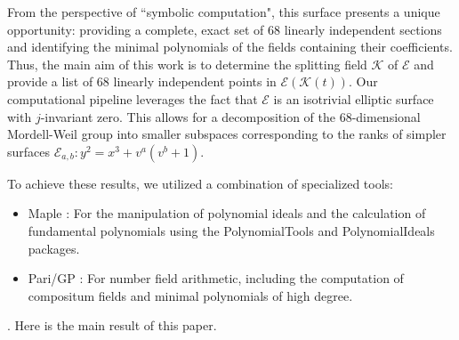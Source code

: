\documentclass[11pt]{amsart}
\newcommand{\Ee}{{\mathcal E}}
\newcommand{\KK}{{\mathcal K}}
\numberwithin{equation}{section}
\numberwithin{table}{section}
\newcommand\<{\langle}
\begin{document}
From the perspective of ``symbolic computation", this surface presents a unique opportunity: providing a complete, exact set of $68$ linearly independent sections and identifying the minimal polynomials of the fields containing their coefficients.
Thus, the main aim of this work is to  determine the splitting field $\KK$ of $\Ee$ and  provide a list of $68$ linearly independent points in $\Ee(\KK(t))$. 	Our computational pipeline leverages the fact that $\mathcal{E}$ is an isotrivial elliptic surface with $j$-invariant zero. This allows for a decomposition of the $68$-dimensional Mordell-Weil group into smaller subspaces corresponding to the ranks of simpler   surfaces
 $\mathcal{E}_{a,b} : y^2 = x^3 + v^a(v^b+1)$.  

	To achieve these results, we utilized a combination of specialized tools:
\begin{itemize}
	\item \textsf{Maple  \cite{maple}}: For the manipulation of polynomial ideals and the calculation of fundamental polynomials using the {\sf PolynomialTools} and {\sf PolynomialIdeals}   packages.
	\item \textsf{Pari/GP \cite{PARI2}}: For number field arithmetic, including the computation of compositum fields and minimal polynomials of high degree.
\end{itemize}


 . Here is the main result of this paper.
\end{document}

